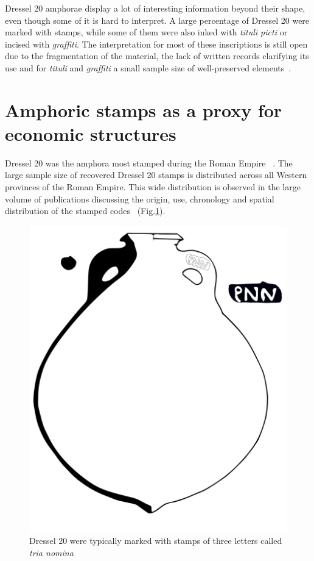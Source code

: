 Dressel 20 amphorae display a lot of interesting information beyond their shape, even though some of it is hard to interpret. A large percentage of Dressel 20 were marked with stamps, while some of them were also inked with \textit{tituli picti} or incised with \textit{graffiti}. The interpretation for most of these inscriptions is still open due to the fragmentation of the material, the lack of written records clarifying its use and for \textit{tituli} and \textit{graffiti} a small sample size of well-preserved elements~\citep{aguilera_evolucion_2007,rovira_guardiola_grafitos_2007}. 

\section{Amphoric stamps as a proxy for economic structures}
\label{sec:2}

Dressel 20 was the amphora most stamped during the Roman Empire ~\citep[18]{millet_anforas_1998}. The large sample size of recovered Dressel 20 stamps is distributed across all Western provinces of the Roman Empire. This wide distribution is observed in the large volume of publications discussing the origin, use, chronology and spatial distribution of the stamped codes~\citep{dressel_ricerche_1878,rodriguez_economioleicola_1977,chicepi1985,millet_anforas_1998, remesal_sellar_2016} (Fig.\ref{amphora}).

\begin{figure}[htp]
	\centering
\includegraphics[scale=0.5]{dressel20}
\caption{Dressel 20 were typically marked with stamps of three letters called \textit{tria nomina}}
\label{amphora}
\end{figure} 

